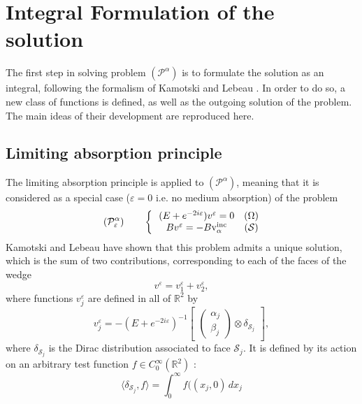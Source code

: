 \section{Integral Formulation of the solution}
The first step in solving problem $(\mathcal{P}^{\alpha})$ is to formulate the solution as an integral, following the formalism of Kamotski and Lebeau \cite{KamotskiLebeau}. In order to do so, a new class of functions is defined, as well as the outgoing solution of the problem. The main ideas of their development are reproduced here.
\subsection{Limiting absorption principle}
The limiting absorption principle is applied to $(\mathcal{P}^{\alpha})$, meaning that it is considered as a special case ($\varepsilon=0$ i.e. no medium absorption) of the problem
\begin{equation}
(\mathcal{P}^{\alpha}_{\varepsilon}) \hspace{2em} \left\{~~
\begin{matrix}
(E+e^{-2i\varepsilon})v^{\varepsilon}=0 & (\Omega) \\
Bv^{\varepsilon}=-B \rm v_{\alpha}^{inc} & (\mathcal{S})
\end{matrix}
\right.
\label{Pabs}
\end{equation}
Kamotski and Lebeau \cite{KamotskiLebeau} have shown that this problem admits a unique solution, which is the sum of two contributions, corresponding to each of the faces of the wedge
\begin{equation}
v^{\varepsilon}=v_1^{\varepsilon}+v_2^{\varepsilon},
\label{v1+v2}
\end{equation}
where functions $v_j^{\varepsilon}$ are defined in all of $\mathbb{R}^2$ by
\begin{equation}
v_j^{\varepsilon}=-(E+e^{-2i\varepsilon})^{-1} \begin{bmatrix}
\begin{pmatrix}
\alpha_j \\
\beta_j
\end{pmatrix}
\otimes \delta_{\mathcal{S}_j}
\end{bmatrix},
\label{vjdef}
\end{equation}
where $\delta_{\mathcal{S}_j}$ is the Dirac distribution associated to face $\mathcal{S}_j$. It is defined by its action on an arbitrary test function $f \in C_0^{\infty}(\mathbb{R}^2)$ :
\begin{equation}
\langle \delta_{\mathcal{S}_j},f\rangle=\int_0^{\infty}f((x_j,0)\, dx_j
\label{defDirac}
\end{equation}
